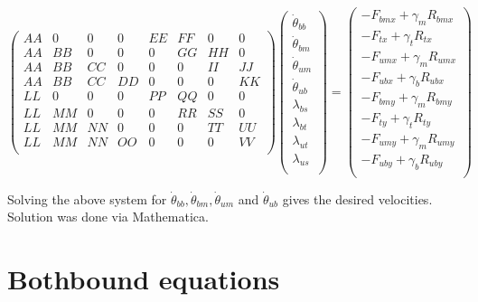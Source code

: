 \documentclass[
11pt, %
english, %
singlespacing, %
headsepline, %
chapterinoneline, %
]{MastersDoctoralThesis} %
\begin{document}
\[
\begin{pmatrix}
  AA & 0 & 0 & 0 & EE & FF & 0 & 0\\
  AA & BB & 0 & 0 & 0 & GG & HH & 0\\
  AA & BB & CC & 0 & 0 & 0 & II & JJ\\
  AA & BB & CC & DD & 0 & 0 & 0 & KK\\
  LL & 0 & 0 & 0 & PP & QQ & 0 & 0\\
  LL & MM & 0 & 0 & 0 & RR & SS & 0\\
  LL & MM & NN & 0 & 0 & 0 & TT & UU\\
  LL & MM & NN & OO & 0 & 0 & 0 & VV\\
\end{pmatrix}
\begin{pmatrix}
    \dot{\theta}_{bb}\\
    \dot{\theta}_{bm}\\
    \dot{\theta}_{um}\\
    \dot{\theta}_{ub}\\
    \lambda_{bs}\\
    \lambda_{bt}\\
    \lambda_{ut}\\
    \lambda_{us}\\
  \end{pmatrix}
=
  \begin{pmatrix}
    -F_{bmx} + \gamma_m R_{bmx}\\
    -F_{tx} + \gamma_t R_{tx}\\
    -F_{umx} + \gamma_m R_{umx}\\
    -F_{ubx} + \gamma_b R_{ubx}\\
    -F_{bmy} + \gamma_m R_{bmy}\\
    -F_{ty} + \gamma_t R_{ty}\\
    -F_{umy} + \gamma_m R_{umy}\\
    -F_{uby} + \gamma_b R_{uby}\\
  \end{pmatrix}
\]

Solving the above system for $\dot{\theta}_{bb}, \dot{\theta}_{bm}, \dot{\theta}_{um}$ and $\dot{\theta}_{ub}$ gives the desired velocities. Solution was done via Mathematica.

\chapter{Bothbound equations} %
\label{sec:AppendixBothboundEquations}
\end{document}
